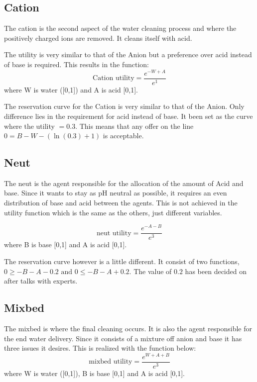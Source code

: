 
\subsection{Cation}
The cation is the second aspect of the water cleaning process and where the positively charged ions are removed. It cleans itself with acid. %

The utility is very similar to that of the Anion but a preference over acid instead of base is required. This results in the function:
\[
\text{Cation utility} = \frac{e^{-W+A}}{e^1}
\] 
where W is water ([0,1]) and A is acid [0,1].

The reservation curve for the Cation is very similar to that of the Anion. Only difference lies in the requirement for acid instead of base. It been set as the curve where the utility $= 0.3$. This means that any offer on the line $0 = B - W - (\ln(0.3)+1)$ is acceptable.

\subsection{Neut}
The neut is the agent responsible for the allocation of the amount of Acid and base. Since it wants to stay as pH neutral as possible, it requires an even distribution of base and acid between the agents. This is not achieved in the utility function which is the same as the others, just different variables.

\[
\text{neut utility} = \frac{e^{-A-B}}{e^3}
\] 
where B is base [0,1] and A is acid [0,1].

The reservation curve however is a little different. It consist of two functions, $0 \geq -B - A - 0.2 \text{ and }  0 \leq -B - A + 0.2$. The value of $0.2$ has been decided on after talks with experts. 


\subsection{Mixbed}

The mixbed is where the final cleaning occurs. It is also the agent responsible for the end water delivery. Since it consists of a mixture off anion and base it has three issues it desires. This is realized with the function below:
\[
\text{mixbed utility} = \frac{e^{W+A+B}}{e^3}
\] 
where W is water ([0,1]), B is base [0,1] and A is acid [0,1].

